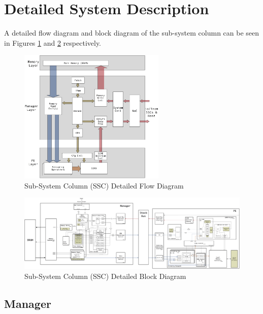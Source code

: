 \documentclass[journal]{IEEEtran}
\begin{document}
\fi

\iffalse


\section{Detailed System Description}
\label{sec:detailedSystemDescription}

A detailed flow diagram and block diagram of the sub-system column can be seen in Figures \ref{fig:DetailedFlowDiagram} and \ref{fig:DetailedBlockDiagram} respectively.
\begin{figure}[!t]
\centering
\captionsetup{justification=centering}
\captionsetup{width=.9\linewidth}
\centerline{
\mbox{\includegraphics[width=2.75in]{DetailedFlowDiagram.jpg}}
}
\center\caption{Sub-System Column (SSC) Detailed Flow Diagram}
\label{fig:DetailedFlowDiagram}
\end{figure}

\begin{figure}[!t]
\centering
\captionsetup{justification=centering}
\centerline{
\mbox{\includegraphics[width=6.0in]{DetailedBlockDiagram.jpg}}
}
\center\caption{Sub-System Column (SSC) Detailed Block Diagram}
\label{fig:DetailedBlockDiagram}
\end{figure}

\subsection{Manager}
\label{sec:manager}
\end{document}
